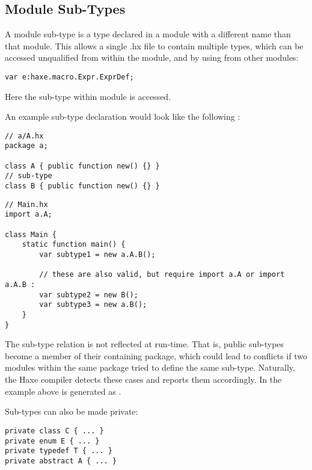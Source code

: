\subsection{Module Sub-Types}
\label{type-system-module-sub-types}

A module sub-type is a type declared in a module with a different name than that module. This allows a single .hx file to contain multiple types, which can be accessed unqualified from within the module, and by using  from other modules:

\begin{lstlisting}
var e:haxe.macro.Expr.ExprDef;
\end{lstlisting}

Here the sub-type  within module  is accessed. 

An example sub-type declaration would look like the following :

\begin{lstlisting}
// a/A.hx
package a;

class A { public function new() {} }
// sub-type
class B { public function new() {} }
\end{lstlisting}

\begin{lstlisting}
// Main.hx
import a.A;

class Main {
    static function main() {
        var subtype1 = new a.A.B();

        // these are also valid, but require import a.A or import a.A.B :
        var subtype2 = new B();
        var subtype3 = new a.B();
    }
}
\end{lstlisting}

The sub-type relation is not reflected at run-time. That is, public sub-types become a member of their containing package, which could lead to conflicts if two modules within the same package tried to define the same sub-type. Naturally, the Haxe compiler detects these cases and reports them accordingly. In the example above  is generated as .

Sub-types can also be made private:

\begin{lstlisting}
private class C { ... }
private enum E { ... }
private typedef T { ... }
private abstract A { ... }
\end{lstlisting}


